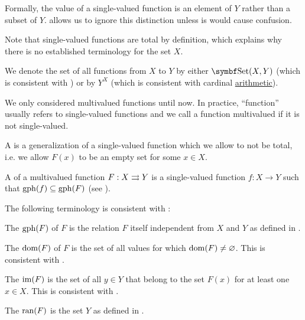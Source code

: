 \begin{definition}
\begin{defenum}[series=def:function]
    Formally, the value of a single-valued function is an element of \( Y \) rather than a subset of \( Y \).  allows us to ignore this distinction unless is would cause confusion.

    Note that single-valued functions are total by definition, which explains why there is no established terminology for the set \( X \).

    We denote the set of all functions from \( X \) to \( Y \) by either \( \Cat{Set}(X, Y) \) (which is consistent with ) or by \( Y^X \) (which is consistent with cardinal \hyperref[def:cardinal_arithmetic]{arithmetic}).

     We only considered multivalued functions until now. In practice, \enquote{function} usually refers to single-valued functions and we call a function multivalued if it is not single-valued.

     A  is a generalization of a single-valued function which we allow to not be total, i.e. we allow \( F(x) \) to be an empty set for some \( x \in X \).

     A  of a multivalued function \( F: X \rightrightarrows Y \) is a single-valued function \( f: X \to Y \) such that \( \operatorname{gph}(f) \subseteq \operatorname{gph}(F) \) (see ).
  \end{defenum}

  The following terminology is consistent with :
  \begin{defenum}[resume=def:function]
     The  \( \operatorname{gph}(F) \) of \( F \) is the relation \( F \) itself independent from \( X \) and \( Y \) as defined in .

     The  \( \operatorname{dom}(F) \) of \( F \) is the set of all values for which \( \operatorname{dom}(F) \neq \varnothing \). This is consistent with .

     The  \( \operatorname{im}(F) \) is the set of all \( y \in Y \) that belong to the set \( F(x) \) for at least one \( x \in X \). This is consistent with .

     The  \( \operatorname{ran}(F) \) is the set \( Y \) as defined in .


\end{defenum}
\end{definition}
